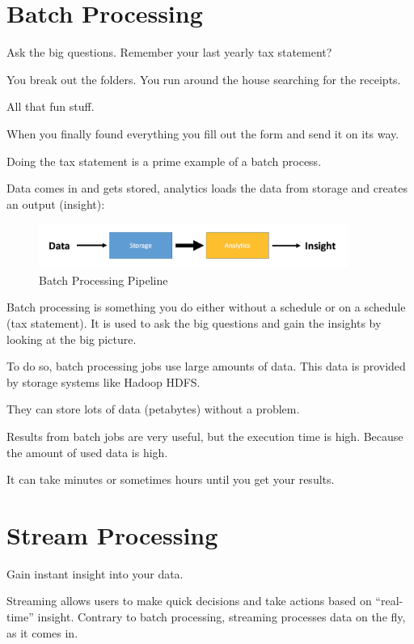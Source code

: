 \documentclass[12pt, numbers=noenddot]{scrreprt} %
\begin{document}
\section{Batch Processing} Ask the big questions. Remember your last yearly tax statement?

You break out the folders. You run around the house searching for the receipts.

All that fun stuff.

When you finally found everything you fill out the form and send it on its way.

Doing the tax statement is a prime example of a batch process.

Data comes in and gets stored, analytics loads the data from storage and creates an output (insight):

\begin{figure}[htbp]
  \centering
     \includegraphics[width=0.9\textwidth]{images/Simple-Batch-Processing-Workflow}
  \caption{Batch Processing Pipeline}
  \label{fig:Bild1}
\end{figure}

Batch processing is something you do either without a schedule or on a schedule (tax statement). It is used to ask the big questions and gain the insights by looking at the big picture.

To do so, batch processing jobs use large amounts of data. This data is provided by storage systems like Hadoop HDFS.

They can store lots of data (petabytes) without a problem.

Results from batch jobs are very useful, but the execution time is high. Because the amount of used data is high.

It can take minutes or sometimes hours until you get your results.



\section{Stream Processing} Gain instant insight into your data.

Streaming allows users to make quick decisions and take actions based on “real-time” insight. Contrary to batch processing, streaming processes data on the fly, as it comes in.
\end{document}
